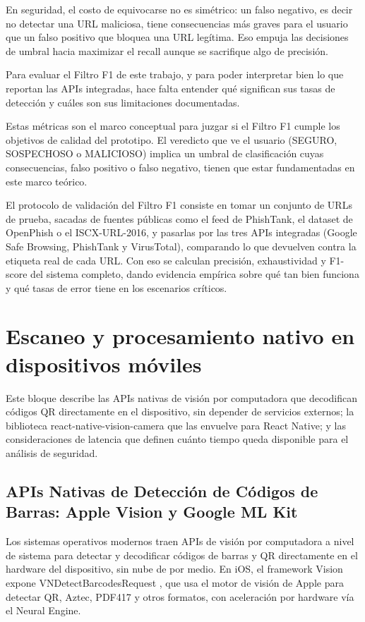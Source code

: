 En seguridad, el costo de equivocarse no es sim\'etrico: un falso negativo, es decir no detectar una URL maliciosa, tiene consecuencias m\'as graves para el usuario que un falso positivo que bloquea una URL leg\'itima. Eso empuja las decisiones de umbral hacia maximizar el recall aunque se sacrifique algo de precisi\'on.

Para evaluar el Filtro F1 de este trabajo, y para poder interpretar bien lo que reportan las APIs integradas, hace falta entender qu\'e significan sus tasas de detecci\'on y cu\'ales son sus limitaciones documentadas.

Estas m\'etricas son el marco conceptual para juzgar si el Filtro F1 cumple los objetivos de calidad del prototipo. El veredicto que ve el usuario (SEGURO, SOSPECHOSO o MALICIOSO) implica un umbral de clasificaci\'on cuyas consecuencias, falso positivo o falso negativo, tienen que estar fundamentadas en este marco te\'orico.

El protocolo de validaci\'on del Filtro F1 consiste en tomar un conjunto de URLs de prueba, sacadas de fuentes p\'ublicas como el feed de PhishTank, el dataset de OpenPhish \cite{openphish} o el ISCX-URL-2016, y pasarlas por las tres APIs integradas (Google Safe Browsing, PhishTank y VirusTotal), comparando lo que devuelven contra la etiqueta real de cada URL. Con eso se calculan precisi\'on, exhaustividad y F1-score del sistema completo, dando evidencia emp\'irica sobre qu\'e tan bien funciona y qu\'e tasas de error tiene en los escenarios cr\'iticos.

\section{Escaneo y procesamiento nativo en dispositivos m\'oviles}

Este bloque describe las APIs nativas de visi\'on por computadora que decodifican c\'odigos QR directamente en el dispositivo, sin depender de servicios externos; la biblioteca react-native-vision-camera que las envuelve para React Native; y las consideraciones de latencia que definen cu\'anto tiempo queda disponible para el an\'alisis de seguridad.

\subsection{APIs Nativas de Detecci\'on de C\'odigos de Barras: Apple Vision y Google ML Kit}

Los sistemas operativos modernos traen APIs de visi\'on por computadora a nivel de sistema para detectar y decodificar c\'odigos de barras y QR directamente en el hardware del dispositivo, sin nube de por medio. En iOS, el framework Vision expone VNDetectBarcodesRequest \cite{apple_vndetectbarcodes}, que usa el motor de visi\'on de Apple para detectar QR, Aztec, PDF417 y otros formatos, con aceleraci\'on por hardware v\'ia el Neural Engine.


